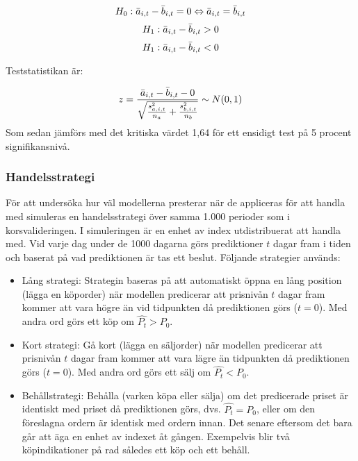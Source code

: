 \documentclass[11pt]{article}
\numberwithin{equation}{section}
\numberwithin{table}{section}
\numberwithin{figure}{section}
\begin{document}
\begin{equation}
    H_0: \Bar{a}_{i,t} - \Bar{b}_{i,t} = 0 \Leftrightarrow \Bar{a}_{i,t} = \Bar{b}_{i,t}
\end{equation}
\begin{equation}
    H_1: \Bar{a}_{i,t} - \Bar{b}_{i,t} > 0
\end{equation}
\begin{equation}
    H_1: \Bar{a}_{i,t} - \Bar{b}_{i,t} < 0
\end{equation}

Teststatistikan är: 

\begin{equation}
    z = \frac{\Bar{a}_{i,t} - \Bar{b}_{i,t} - 0}{\sqrt{\frac{s_{a,i,t}^2}{n_a}+\frac{s_{b,i,t}^2}{n_b}}} \sim N(0,1)
\end{equation}
Som sedan jämförs med det kritiska värdet 1,64 för ett ensidigt test på 5 procent signifikansnivå.


\subsubsection{Handelsstrategi}
För att undersöka hur väl modellerna presterar när de appliceras för att handla med simuleras en handelsstrategi över samma 1.000 perioder som i korsvalideringen. I simuleringen är en enhet av index utdistribuerat att handla med. Vid varje dag under de 1000 dagarna görs prediktioner $t$ dagar fram i tiden och baserat på vad prediktionen är tas ett beslut. Följande strategier används:

\begin{itemize}
    \item Lång strategi: Strategin baseras på att automatiskt öppna en lång position (lägga en köporder) när modellen predicerar att prisnivån $t$ dagar fram kommer att vara högre än vid tidpunkten då prediktionen görs ($t=0$). Med andra ord görs ett köp om $\hat{P_t} > P_0$.
    \item Kort strategi: Gå kort (lägga en säljorder) när modellen predicerar att prisnivån $t$ dagar fram kommer att vara lägre än tidpunkten då prediktionen görs ($t=0$). Med andra ord görs ett sälj om $\hat{P_t} < P_0$.
    \item Behållstrategi: Behålla (varken köpa eller sälja) om det predicerade priset är identiskt med priset då prediktionen görs, dvs. $\hat{P_t} = P_0$, eller om den föreslagna ordern är identisk med ordern innan. Det senare eftersom det bara går att äga en enhet av indexet åt gången. Exempelvis blir två köpindikationer på rad således ett köp och ett behåll.
\end{itemize}
\end{document}
